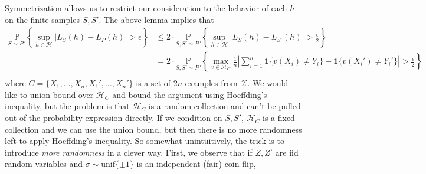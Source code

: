\documentclass[]{article}
\begin{document}
Symmetrization allows us to restrict our consideration to the behavior
of each \(h\) on the finite samples \(S, S'\). The above lemma implies
that \[
\begin{align*}
\underset{S\sim P^n}{\mathbb{P}} \left\{ \sup_{h\in \mathcal{H}} |L_S(h) - L_P(h)| > \epsilon\right\} &\le 2\cdot \underset{S,S'\sim P^n}{\mathbb{P}} \left\{ \sup_{h\in \mathcal{H}} |L_S(h) - L_{S'}(h)| > \frac{\epsilon}{2}\right\} \\[5px]
&= 2\cdot \underset{S,S'\sim P^n}{\mathbb{P}} \left\{ \max_{v\in \mathcal{H}_C} \frac{1}{n}\left|\sum_{i=1}^n \mathbf{1}\{v(X_i)\ne Y_i\} - \mathbf{1}\{v(X_i')\ne Y_i'\}\right| > \frac{\epsilon}{2}\right\}\\[5px]
\end{align*}
\] where \(C = \{ X_1, \ldots, X_n, X_1', \ldots, X_n'\}\) is a set of
\(2n\) examples from \(\mathcal{X}\). We would like to union bound over
\(\mathcal{H}_C\) and bound the argument using Hoeffding's inequality,
but the problem is that \(\mathcal{H}_C\) is a random collection and
can't be pulled out of the probability expression directly. If we
condition on \(S, S'\), \(\mathcal{H}_C\) is a fixed collection and we
can use the union bound, but then there is no more randomness left to
apply Hoeffding's inequality. So somewhat unintuitively, the trick is to
introduce \emph{more randomness} in a clever way. First, we observe that
if \(Z, Z'\) are iid random variables and
\(\sigma\sim \text{unif}\{\pm 1\}\) is an independent (fair) coin flip,
\end{document}
